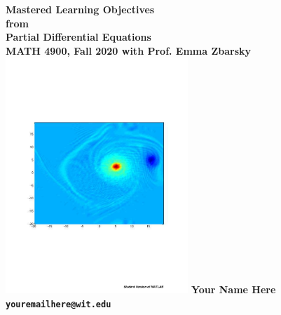 \documentclass{article}
\newtheorem{theorem}{Theorem}[section]
\begin{document}
\begin{titlepage}
  \begin{center}
    \bfseries
\huge Mastered Learning Objectives \\  from \\ Partial Differential Equations \\[.5in]
\large MATH 4900, Fall 2020 with Prof. Emma Zbarsky
\vfill
\includegraphics[height=3.5in, angle=90]{coolimage}
\vfill
\LARGE Your Name Here \\[.2in]
\texttt{youremailhere@wit.edu}
\end{center}      
\end{titlepage}
\newpage
\tableofcontents
\newpage

\end{document}
